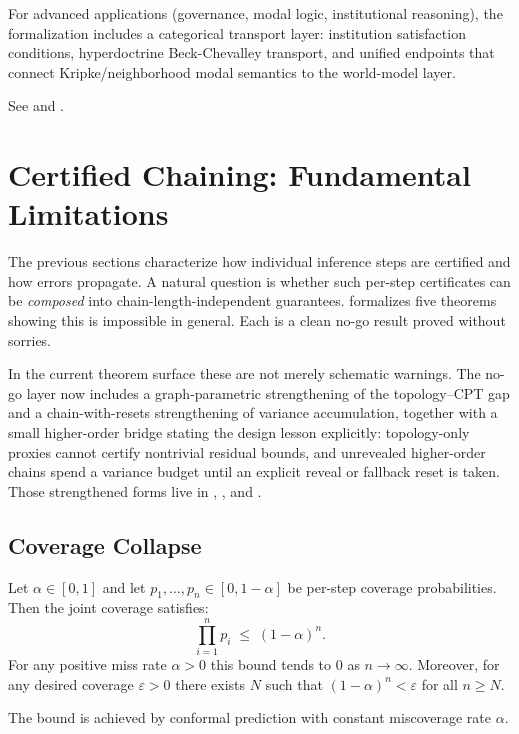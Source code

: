 \documentclass[11pt,openany]{report}
\begin{document}
For advanced applications (governance, modal logic, institutional
reasoning), the formalization includes a categorical transport layer:
institution satisfaction conditions, hyperdoctrine Beck-Chevalley
transport, and unified endpoints that connect Kripke/neighborhood
modal semantics to the world-model layer.

See  and
.


\section{Certified Chaining: Fundamental Limitations}
\label{sec:certified-chaining-nogo}

The previous sections characterize how individual inference steps are
certified and how errors propagate.  A natural question is whether such
per-step certificates can be \emph{composed} into chain-length-independent
guarantees.  \xiPLN{} formalizes five theorems showing this is impossible in
general.  Each is a clean no-go result proved without sorries.

In the current theorem surface these are not merely schematic warnings.
The no-go layer now includes a graph-parametric strengthening of the
topology--CPT gap and a chain-with-resets strengthening of variance
accumulation, together with a small higher-order bridge stating the design
lesson explicitly: topology-only proxies cannot certify nontrivial residual
bounds, and unrevealed higher-order chains spend a variance budget until an
explicit reveal or fallback reset is taken.  Those strengthened forms live in
,
, and
.

\subsection*{Coverage Collapse}

\begin{theorem}
\label{thm:coverage-collapse}
Let $\alpha \in [0,1]$ and let $p_1,\dots,p_n \in [0, 1-\alpha]$ be
per-step coverage probabilities.  Then the joint coverage satisfies:
\[
  \prod_{i=1}^{n} p_i \;\le\; (1-\alpha)^n.
\]
For any positive miss rate $\alpha > 0$ this bound tends to $0$ as
$n \to \infty$.  Moreover, for any desired coverage $\varepsilon > 0$ there
exists $N$ such that $(1-\alpha)^n < \varepsilon$ for all $n \ge N$.

The bound is achieved by conformal prediction with constant miscoverage
rate $\alpha$.
\end{theorem}
\end{document}
